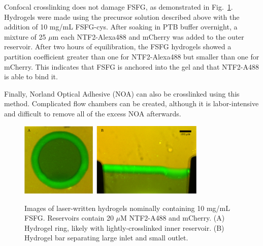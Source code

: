 Confocal crosslinking does not damage FSFG, as demonstrated in Fig.~\ref{fig:LW-NTF2-images}.  Hydrogels were made using the precursor solution described above with the addition of 10 mg/mL FSFG-cys.  After soaking in PTB buffer overnight, a mixture of 25 $\mu$m each NTF2-Alexa488 and mCherry was added to the outer reservoir.  After two hours of equilibration, the FSFG hydrogels showed a partition coefficient greater than one for NTF2-Alexa488 but smaller than one for mCherry.  This indicates that FSFG is anchored into the gel and that NTF2-A488 is able to bind it.

Finally, Norland Optical Adhesive (NOA) can also be crosslinked using this method.  Complicated flow chambers can be created, although it is labor-intensive and difficult to remove all of the excess NOA afterwards.

\begin{figure} %
\caption{Images of laser-written hydrogels nominally containing 10 mg/mL FSFG. Reservoirs contain 20 $\mu$M NTF2-A488 and mCherry. (A) Hydrogel ring, likely with lightly-crosslinked inner reservoir. (B) Hydrogel bar separating large inlet and small outlet.}
\centering
\includegraphics[width=0.8\textwidth]{figs/ch03/example-LW-gels-NTF2}
\label{fig:LW-NTF2-images}
\end{figure} %

